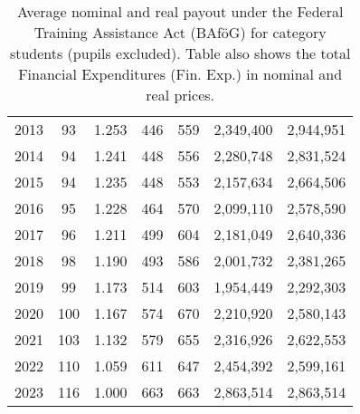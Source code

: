\begin{table}[H]
\begin{tabular}{rcc|rr|rr}
2013 & 93 & 1.253 & 446 & 559 & 2,349,400 & 2,944,951 \\
2014 & 94 & 1.241 & 448 & 556 & 2,280,748 & 2,831,524 \\
2015 & 94 & 1.235 & 448 & 553 & 2,157,634 & 2,664,506 \\
2016 & 95 & 1.228 & 464 & 570 & 2,099,110 & 2,578,590 \\
2017 & 96 & 1.211 & 499 & 604 & 2,181,049 & 2,640,336 \\
2018 & 98 & 1.190 & 493 & 586 & 2,001,732 & 2,381,265 \\
2019 & 99 & 1.173 & 514 & 603 & 1,954,449 & 2,292,303 \\
2020 & 100 & 1.167 & 574 & 670 & 2,210,920 & 2,580,143 \\
2021 & 103 & 1.132 & 579 & 655 & 2,316,926 & 2,622,553 \\
2022 & 110 & 1.059 & 611 & 647 & 2,454,392 & 2,599,161 \\
2023 & 116 & 1.000 & 663 & 663 & 2,863,514 & 2,863,514 \\
\hline
\end{tabular}
\caption{Average nominal and real payout under the Federal Training Assistance Act (BAföG) 
for category students (pupils excluded). Table also shows the total Financial Expenditures (Fin. Exp.) 
in nominal and real prices.}
\label{table:payout_over_time}
\end{table}



